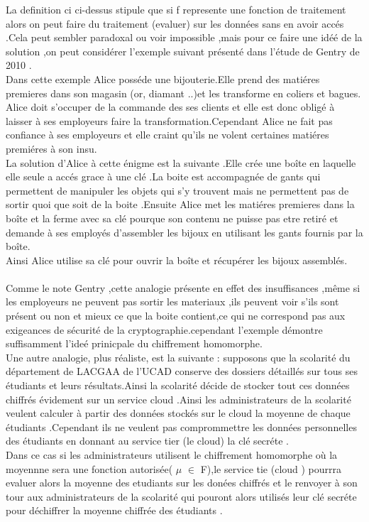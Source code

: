 La definition ci ci-dessus stipule que si f represente une fonction de traitement alors on peut faire  du traitement (evaluer) sur les données sans en avoir accés .Cela peut sembler paradoxal ou voir impossible ,mais pour ce faire une  idéé de la solution  ,on peut considérer l'exemple suivant présenté dans l'étude de Gentry de 2010 \cite{3}.\\
Dans cette exemple Alice posséde une bijouterie.Elle prend des matiéres premieres dans son magasin (or, diamant ..)et les transforme en coliers et bagues. Alice doit s'occuper de la commande  des ses clients et elle est donc obligé à laisser à ses employeurs faire la transformation.Cependant Alice ne fait pas confiance à ses employeurs et elle craint qu'ils ne volent certaines matiéres premiéres à son insu.\\
La solution d'Alice à cette énigme est la suivante .Elle crée une boîte en laquelle elle seule a accés grace à une clé .La boite est accompagnée de gants qui permettent de manipuler  les objets qui s'y trouvent mais ne permettent pas de sortir quoi que soit de la boite .Ensuite Alice met les matiéres premieres dans la boîte et la ferme  avec sa clé pourque son contenu ne puisse pas etre retiré et demande à ses employés d'assembler les bijoux en utilisant les gants fournis par la boîte.\\
Ainsi Alice utilise sa clé pour ouvrir la boîte et récupérer les bijoux assemblés.\\
\\
Comme le note Gentry ,cette analogie présente en effet des insuffisances ,même  si les employeurs ne peuvent pas sortir les materiaux ,ils peuvent voir s'ils sont présent ou non et mieux ce que la boite contient,ce qui ne correspond pas aux exigeances de sécurité de la cryptographie.cependant l'exemple démontre suffisamment l'ideé prinicpale du chiffrement homomorphe.
\\
Une autre analogie, plus réaliste, est la suivante : supposons que la scolarité du département de LACGAA de l'UCAD  conserve des dossiers détaillés sur tous ses étudiants et leurs résultats.Ainsi la scolarité décide de  stocker tout ces données chiffrés évidement sur un service cloud .Ainsi les administrateurs de la scolarité veulent calculer à partir des données stockés sur le cloud la moyenne de chaque étudiants .Cependant ils ne veulent pas comprommettre les données personnelles des étudiants en donnant au service tier (le cloud) la clé secréte .\\
Dans ce cas si les administrateurs utilisent le chiffrement homomorphe où la moyennne sera une fonction autorisée( $\mu$ $ \in$ F),le service tie (cloud ) pourrra evaluer alors la moyenne des etudiants sur les donées chiffrés et le renvoyer à son tour aux administrateurs de la scolarité qui pouront alors utilisés leur clé secréte pour déchiffrer la moyenne chiffrée des étudiants .
